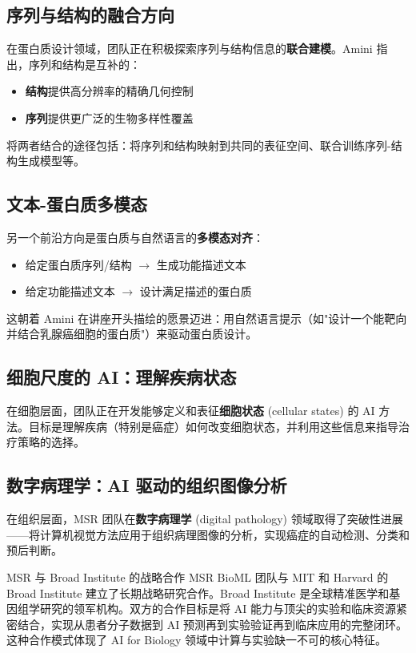 \documentclass[a4paper]{article}
\begin{document}
\subsection{序列与结构的融合方向}

在蛋白质设计领域，团队正在积极探索序列与结构信息的\textbf{联合建模}。Amini 指出，序列和结构是互补的：

\begin{itemize}
    \item \textbf{结构}提供高分辨率的精确几何控制
    \item \textbf{序列}提供更广泛的生物多样性覆盖
\end{itemize}

将两者结合的途径包括：将序列和结构映射到共同的表征空间、联合训练序列-结构生成模型等。

\subsection{文本-蛋白质多模态}

另一个前沿方向是蛋白质与自然语言的\textbf{多模态对齐}：

\begin{itemize}
    \item 给定蛋白质序列/结构 $\rightarrow$ 生成功能描述文本
    \item 给定功能描述文本 $\rightarrow$ 设计满足描述的蛋白质
\end{itemize}

这朝着 Amini 在讲座开头描绘的愿景迈进：用自然语言提示（如"设计一个能靶向并结合乳腺癌细胞的蛋白质"）来驱动蛋白质设计。

\subsection{细胞尺度的 AI：理解疾病状态}

在细胞层面，团队正在开发能够定义和表征\textbf{细胞状态} (cellular states) 的 AI 方法。目标是理解疾病（特别是癌症）如何改变细胞状态，并利用这些信息来指导治疗策略的选择。

\subsection{数字病理学：AI 驱动的组织图像分析}

在组织层面，MSR 团队在\textbf{数字病理学} (digital pathology) 领域取得了突破性进展——将计算机视觉方法应用于组织病理图像的分析，实现癌症的自动检测、分类和预后判断。

\begin{knowledgebox}{MSR 与 Broad Institute 的战略合作}
MSR BioML 团队与 MIT 和 Harvard 的 Broad Institute 建立了长期战略研究合作。Broad Institute 是全球精准医学和基因组学研究的领军机构。双方的合作目标是将 AI 能力与顶尖的实验和临床资源紧密结合，实现从患者分子数据到 AI 预测再到实验验证再到临床应用的完整闭环。这种合作模式体现了 AI for Biology 领域中计算与实验缺一不可的核心特征。
\end{knowledgebox}
\end{document}
